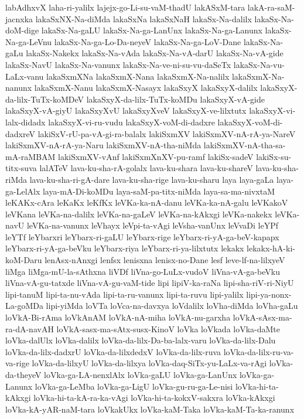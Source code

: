 {labAdhxvX
laha-ri-yalilx
lajejx-go-Li-su-vaM-thadU
lakASxM-tara
lakA-ra-saM-jacnxka
lakaSxNX-Na-diMda
lakaSxNa
lakaSxNaH
lakaSx-Na-dalilx
lakaSx-Na-doM-dige
lakaSx-Na-gaLU
lakaSx-Na-ga-LanUnx
lakaSx-Na-ga-Lanunx
lakaSx-Na-ga-LeVnu
lakaSx-Na-ga-Lo-Da-neyeV
lakaSx-Na-ga-LoV-Dane
lakaSx-Na-gaLu
lakaSx-Nakekx
lakaSx-Na-vAda
lakaSx-Na-vA-darU
lakaSx-Na-vA-gide
lakaSx-NavU
lakaSx-Na-vanunx
lakaSx-Na-ve-ni-su-vu-daSeTx
lakaSx-Na-vu-LaLx-vanu
lakaSxmXNa
lakaSxmX-Nana
lakaSxmX-Na-nalilx
lakaSxmX-Na-nanunx
lakaSxmX-Nanu
lakaSxmX-Nasayx
lakaSxyX
lakaSxyX-dalilx
lakaSxyX-da-lilx-TuTx-koMDeV
lakaSxyX-da-lilx-TuTx-koMDu
lakaSxyX-vA-gide
lakaSxyX-vA-giyU
lakaSxyXvU
lakaSxyXveV
lakaSxyX-ve-lilxtutx
lakaSxyX-vi-lalx-didadx
lakaSxyX-vi-ru-vudu
lakaSxyX-voM-di-dadxre
lakaSxyX-voM-di-dadxreV
lakiSxV-rU-pa-vA-gi-ra-balalx
lakiSxmXV
lakiSxmXV-nA-rA-ya-NareV
lakiSxmXV-nA-rA-ya-Naru
lakiSxmXV-nA-tha-niMda
lakiSxmXV-nA-tha-sa-mA-raMBAM
lakiSxmXV-vAnf
lakiSxmXnXV-pu-ramf
lakiSx-sadeV
lakiSx-su-titx-suva
lalATeV
lava-ku-sha-rA-golalx
lava-ku-shara
lava-ku-shareV
lava-ku-sha-riMda
lava-ku-sha-ri-gA-dare
lava-ku-sha-rige
lava-ku-sharu
laya
laya-gaLa
laya-ga-LelAlx
laya-mA-Di-koMDu
laya-saM-pa-titx-niMda
laya-sa-ma-nivxtaM
leKAKx-cAra
leKaKx
leKfKx
leVKa-ka-nA-danu
leVKa-ka-nA-galu
leVKakoV
leVKana
leVKa-na-dalilx
leVKa-na-gaLeV
leVKa-na-kAkxgi
leVKa-nakekx
leVKa-navU
leVKa-na-vanunx
leVhayx
leVpi-ta-vAgi
leVsha-vanUnx
leVvaDi
leYPf
leYTf
leYbarxri
leYbarx-ri-gaLU
leYbarx-rige
leYbarx-ri-yA-ga-beV-kapapx
leYbarx-ri-yA-ga-beVku
leYbarx-riya
leYbarx-ri-ya-lilxtutx
lekakx
lekakx-hA-ki-koM-Daru
lenAsx-nAnxgi
lenfsx
lenisxna
lenisx-no-Dane
lesf
leve-lf-na-lilxyeV
liMga
liMga-mU-la-sAthxna
liVDf
liVna-go-LuLx-vudoV
liVna-vA-ga-beVku
liVna-vA-gu-tatxde
liVna-vA-gu-vaM-tide
lipi
lipiV-ka-raNa
lipi-sha-riV-ri-NiyU
lipi-tanuM
lipi-ta-nu-vAda
lipi-ta-ru-vanunx
lipi-ta-ruvu
lipi-yalilx
lipi-ya-nonx-La-goMDa
lipi-yiMda
loVTa
loVca-na-davxya
loVdalilx
loVha-diMda
loVha-gaLu
loVkA-Bi-rAma
loVkAnAM
loVkA-nA-miha
loVkA-nu-garxha
loVkA-sAsx-ma-ra-dA-navAH
loVkA-sasx-ma-sAtx-susx-KinoV
loVka
loVkada
loVka-daMte
loVka-dalUlx
loVka-dalilx
loVka-da-lilx-Da-ba-lalx-varu
loVka-da-lilx-Dalu
loVka-da-lilx-dadxrU
loVka-da-lilxdedxV
loVka-da-lilx-ruva
loVka-da-lilx-ru-va-va-rige
loVka-da-lilxyU
loVka-da-lilxya
loVka-daq-SiTx-yu-LaLx-va-rAgi
loVka-da-theyeV
loVka-ga-LA-nenxlAlx
loVka-gaLU
loVka-ga-LanUnx
loVka-ga-Lanunx
loVka-ga-LeMba
loVka-ga-LigU
loVka-gu-ru-ga-Le-nisi
loVka-hi-ta-kAkxgi
loVka-hi-ta-kA-ra-ka-vAgi
loVka-hi-ta-kokxV-sakxra
loVka-kAkxgi
loVka-kA-yAR-naM-tara
loVkakUkx
loVka-kaM-Taka
loVka-kaM-Ta-ka-ranunx
}
